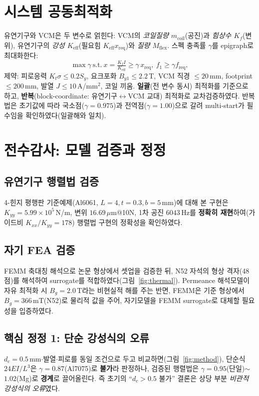 \documentclass[10pt,twocolumn,letterpaper]{article}
\begin{document}
\section{시스템 공동최적화}
유연기구와 VCM은 두 변수로 얽힌다: VCM의 \emph{코일질량 $m_{\text{coil}}$}(공진)과 \emph{힘상수 $K_f$}(변위), 유연기구의 \emph{강성 $K_{\text{eff}}$}(필요힘 $K_{\text{eff}}x_{\text{req}}$)와 \emph{질량 $M_{\text{flex}}$}. 스펙 충족률 $\gamma$를 epigraph로 최대화한다:
\begin{equation}
\max\gamma~\text{s.t.}~ x=\tfrac{K_fI}{K_{\text{eff}}}\!\ge\!\gamma\,x_{\text{req}},~ f_1\!\ge\!\gamma f_{\text{req}},
\end{equation}
제약: 피로응력 $K_t\sigma\le0.2S_y$, 요크포화 $B_{y1}\le2.2$\,T, VCM 직경 $\le20$\,mm, footprint $\le200$\,mm, 발열 $J\le10$\,A/mm$^2$, 코일 끼움. \textbf{일괄}(전 변수 동시) 최적화를 기준으로 하고, \textbf{반복}(block-coordinate: 유연기구$\leftrightarrow$VCM 교대) 최적화로 교차검증하였다. 반복법은 초기값에 따라 국소점($\gamma=0.975$)과 전역점($\gamma=1.00$)으로 갈려 multi-start가 필수임을 확인하였다(일괄해와 일치).

\section{전수감사: 모델 검증과 정정}
\subsection{유연기구 행렬법 검증}
4-힌지 평행판 기준예제(Al6061, $L\!=\!4,t\!=\!0.3,b\!=\!5$\,mm)에 대해 본 구현은 $K_{yy}=5.99\times10^5$\,N/m, 변위 $16.69\,\mu$m@10N, 1차 공진 $6043$\,Hz를 \textbf{정확히 재현}하여(가이드비 $K_{xx}/K_{yy}=178$) 행렬법 구현의 정확성을 확인하였다.

\subsection{자기 FEA 검증}
FEMM 축대칭 해석으로 논문 형상에서 셋업을 검증한 뒤, N52 자석의 형상 격자(48점)를 해석하여 surrogate를 적합하였다(그림~\ref{fig:thermal}). Permeance 해석모델이 자유 최적화 시 $B_g\!=\!2.0$\,T라는 비현실적 해를 주는 반면, FEMM은 기준 형상에서 $B_g\!=\!366$\,mT(N52)로 물리적 값을 주어, 자기모델을 FEMM surrogate로 대체할 필요성을 입증하였다.

\subsection{핵심 정정 1: 단순 강성식의 오류}
$d_c=0.5$\,mm$\cdot$발열$\cdot$피로를 동일 조건으로 두고 비교하면(그림~\ref{fig:method}), 단순식 $24EI/L^3$은 $\gamma=0.87$(Al7075)로 \textbf{불가}라 판정하나, 검증된 행렬법은 $\gamma=0.95$(단일)$\sim$$1.02$(Mg)로 \textbf{경계}로 끌어올린다. 즉 초기의 ``$d_c>0.5$ 불가'' 결론은 상당 부분 \emph{비관적 강성식의 오류}였다.
\end{document}
